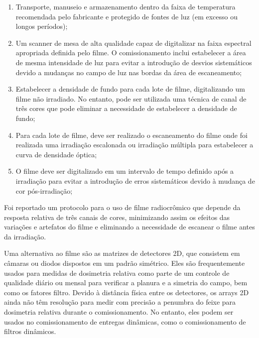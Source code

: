 \documentclass[11pt,a4paper]{article}
\begin{document}
	\begin{enumerate}[label=\textcolor{CarnationPink}{\arabic*${}^\circ $}]
		\item Transporte, manuseio e armazenamento dentro da faixa de temperatura recomendada pelo fabricante e protegido de fontes de luz (em excesso ou longos períodos);
		
		\item Um scanner de mesa de alta qualidade capaz de digitalizar na faixa espectral apropriada definida pelo filme. O comissionamento inclui estabelecer a área de mesma intensidade de luz para evitar a introdução de desvios sistemáticos devido a mudanças no campo de luz nas bordas da área de escaneamento;
		
		\item Estabelecer a densidade de fundo para cada lote de filme, digitalizando um filme não irradiado. No entanto, pode ser utilizada uma técnica de canal de três cores que pode eliminar a necessidade de estabelecer a densidade de fundo;
		
		\item Para cada lote de filme, deve ser realizado o escaneamento do filme onde foi realizada uma irradiação escalonada ou irradiação  múltipla para estabelecer a curva de densidade óptica;
		
		\item O filme deve ser digitalizado em um intervalo de tempo definido após a irradiação para evitar a introdução de erros sistemáticos devido à mudança de cor pós-irradiação;
	\end{enumerate}

	Foi reportado um protocolo para o uso de filme radiocrômico que depende da resposta relativa de três canais de cores, minimizando assim os efeitos das variações e artefatos do filme e eliminando a necessidade de escanear o filme antes da irradiação.

	Uma alternativa ao filme são as matrizes de detectores 2D, que consistem em câmaras ou diodos dispostos em um padrão simétrico. Eles são frequentemente usados para medidas de dosimetria relativa como parte de um controle de qualidade diário ou mensal para verificar a planura e a simetria do campo, bem como os fatores filtro. Devido à distância física entre os detectores, os arrays 2D ainda não têm resolução para medir com precisão a penumbra do feixe para dosimetria relativa durante o comissionamento. No entanto, eles podem ser usados no comissionamento de entregas dinâmicas, como o comissionamento de filtros dinâmicos.
\end{document}
